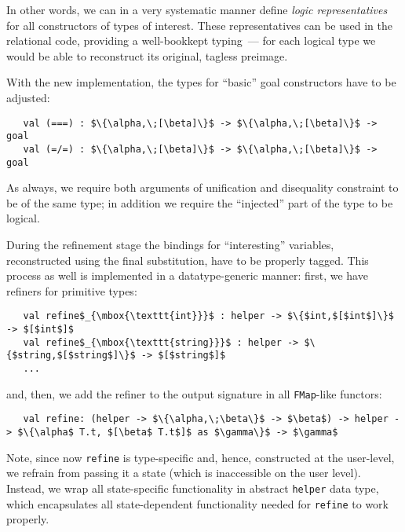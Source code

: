In other words, we can in a very systematic manner define \emph{logic representatives} for all constructors
of types of interest. These representatives can be used in the relational code, providing a well-bookkept
typing~--- for each logical type we would be able to reconstruct its original, tagless preimage.

With the new implementation, the types for ``basic'' goal constructors have to be adjusted:

\begin{lstlisting}
   val (===) : $\{\alpha,\;[\beta]\}$ -> $\{\alpha,\;[\beta]\}$ -> goal
   val (=/=) : $\{\alpha,\;[\beta]\}$ -> $\{\alpha,\;[\beta]\}$ -> goal
\end{lstlisting}

As always, we require both arguments of unification and disequality constraint to be of the same type; in addition
we require the ``injected'' part of the type to be logical.

During the refinement stage the bindings for ``interesting'' variables, reconstructed using the final
substitution, have to be properly tagged. This process as well is implemented in a datatype-generic manner:
first, we have refiners for primitive types:

\begin{lstlisting}
   val refine$_{\mbox{\texttt{int}}}$ : helper -> $\{$int,$[$int$]\}$ -> $[$int$]$
   val refine$_{\mbox{\texttt{string}}}$ : helper -> $\{$string,$[$string$]\}$ -> $[$string$]$
   ...
\end{lstlisting}

and, then, we add the refiner to the output signature in all \lstinline{FMap}-like functors:

\begin{lstlisting}
   val refine: (helper -> $\{\alpha,\;\beta\}$ -> $\beta$) -> helper -> $\{\alpha$ T.t, $[\beta$ T.t$]$ as $\gamma\}$ -> $\gamma$
\end{lstlisting}

Note, since now \lstinline{refine} is type-specific and, hence, constructed at the user-level, we refrain from passing
it a state (which is inaccessible on the user level). Instead, we wrap all state-specific functionality in
abstract \lstinline{helper} data type, which encapsulates all state-dependent functionality needed for \lstinline{refine}
to work properly.
